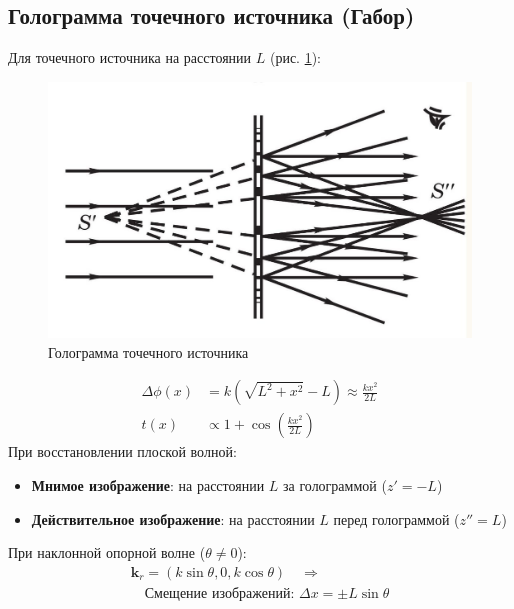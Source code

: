 \documentclass[aps,twocolumn,secnumarabic,balancelastpage,amsmath,amssymb,nofootinbib, floatfix]{revtex4-1}
\begin{document}
\subsection{Голограмма точечного источника (Габор)}
Для точечного источника на расстоянии $L$ (рис. \ref{fig:point}):
\begin{figure}[H]
	\centering
	\includegraphics[width=\columnwidth]{images/point_s_t.jpeg}
	\caption{Голограмма точечного источника}
	\label{fig:point}
\end{figure}
\begin{equation}
	\begin{split}
		\Delta \phi(x) &= k \left( \sqrt{L^2 + x^2} - L \right) \approx \frac{k x^2}{2L} \\
		t(x) &\propto 1 + \cos\left( \frac{k x^2}{2L} \right)
	\end{split}
\end{equation}
При восстановлении плоской волной:
\begin{itemize}
	\item \textbf{Мнимое изображение}: на расстоянии $L$ за голограммой ($z' = -L$)
	\item \textbf{Действительное изображение}: на расстоянии $L$ перед голограммой ($z'' = L$)
\end{itemize}
При наклонной опорной волне ($\theta \neq 0$):
\begin{equation}
	\begin{split}
	\mathbf{k}_r = (k \sin\theta, 0, k \cos\theta) \quad \Rightarrow \\
	\quad \text{Смещение изображений: } \Delta x = \pm L \sin\theta
	\end{split}
\end{equation}
\end{document}
